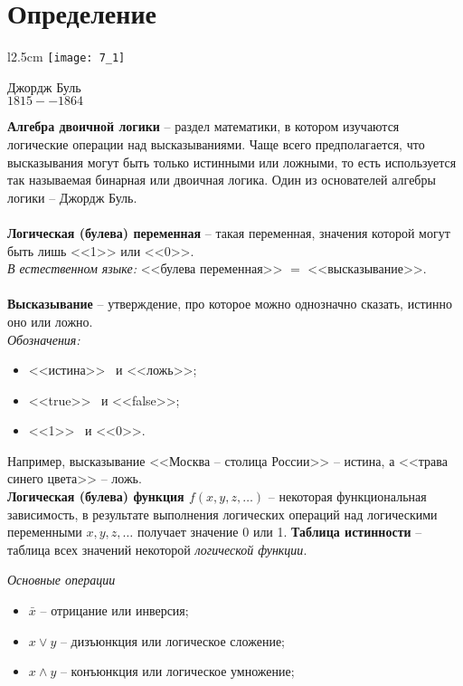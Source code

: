 \section{Определение}
\begin{wrapfigure}[13]{l}{2.5cm}
\texttt{[image: 7\_1]}
\begin{center}
\caption{}
\footnotesize{Джордж Буль}
\\\footnotesize{$1815 -- 1864$}
\end{center}
\end{wrapfigure}
\textbf{Алгебра двоичной логики} -- раздел математики, в котором изучаются логические операции над высказываниями. Чаще всего предполагается, что высказывания могут быть только истинными или ложными, то есть используется так называемая бинарная или двоичная логика. Один из основателей алгебры логики -- Джордж Буль.
\\
\\\textbf{Логическая (булева) переменная} -- такая переменная, значения которой могут быть лишь <<1>> или <<0>>.
\\\emph{В естественном языке:} <<булева переменная>> $=$ <<высказывание>>.
\\
\textbf{\\Высказывание} -- утверждение, про которое можно однозначно сказать, истинно оно или ложно.
\\\emph{Обозначения:}
\begin{itemize}
  \item <<истина>> \ и <<ложь>>;
  \item <<true>> \ и <<false>>;
  \item <<1>> \ и <<0>>.
\end{itemize}
Например, высказывание <<Москва -- столица России>> -- истина, а <<трава синего цвета>> -- ложь.
\\
\textbf{Логическая (булева) функция $f(x, y, z, …)$} -- некоторая функциональная зависимость, в результате выполнения логических операций над логическими переменными $x, y, z,\dots$ получает значение 0 или 1.
\textbf{Таблица истинности} -- таблица всех значений некоторой \emph{логической функции}.
\begin{center}
  \emph{Основные операции}
\end{center}
\begin{itemize}
\item $\bar{x}$ -- отрицание или инверсия;
\item$x \vee y$ -- дизъюнкция или логическое сложение;
\item$x \wedge y$ -- конъюнкция или логическое умножение;\\
\end{itemize}
